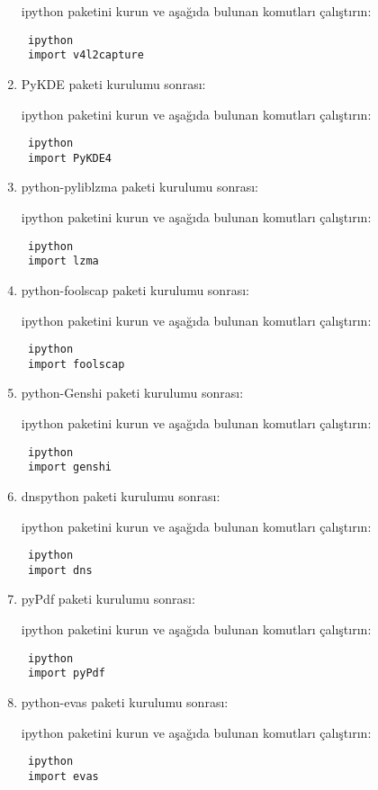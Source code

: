 \documentclass[a4paper,10pt]{article}
\begin{document}
\begin{enumerate}
ipython paketini kurun ve aşağıda bulunan komutları çalıştırın:
\begin{verbatim}
 ipython
 import v4l2capture
\end{verbatim}

\item PyKDE paketi kurulumu sonrası:

ipython paketini kurun ve aşağıda bulunan komutları çalıştırın:
\begin{verbatim}
 ipython
 import PyKDE4
\end{verbatim}

\item python-pyliblzma paketi kurulumu sonrası:

ipython paketini kurun ve aşağıda bulunan komutları çalıştırın:
\begin{verbatim}
 ipython
 import lzma
\end{verbatim}

\item python-foolscap paketi kurulumu sonrası:

ipython paketini kurun ve aşağıda bulunan komutları çalıştırın:
\begin{verbatim}
 ipython
 import foolscap
\end{verbatim}

\item python-Genshi paketi kurulumu sonrası:

ipython paketini kurun ve aşağıda bulunan komutları çalıştırın:
\begin{verbatim}
 ipython
 import genshi
\end{verbatim}

\item dnspython paketi kurulumu sonrası:

ipython paketini kurun ve aşağıda bulunan komutları çalıştırın:
\begin{verbatim}
 ipython
 import dns
\end{verbatim}
\item pyPdf paketi kurulumu sonrası:

ipython paketini kurun ve aşağıda bulunan komutları çalıştırın:
\begin{verbatim}
 ipython
 import pyPdf
\end{verbatim}

\item python-evas paketi kurulumu sonrası:

ipython paketini kurun ve aşağıda bulunan komutları çalıştırın:
\begin{verbatim}
 ipython
 import evas
\end{verbatim}


\end{enumerate}
\end{document}
